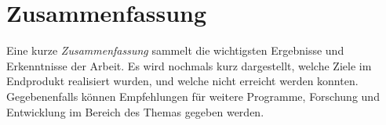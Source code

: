 \chapter{Zusammenfassung}

Eine kurze \emph{Zusammenfassung} sammelt die wichtigsten Ergebnisse und Erkenntnisse der Arbeit.
Es wird nochmals kurz dargestellt, welche Ziele im Endprodukt realisiert wurden, und welche nicht erreicht werden konnten. Gegebenenfalls können Empfehlungen für weitere Programme, Forschung und Entwicklung im Bereich des Themas gegeben werden.
